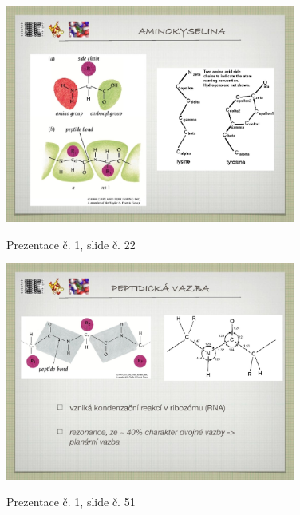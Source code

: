 \documentclass[DIV=8]{scrreprt}
\begin{document}
\begin{figure}
    \caption{Prezentace č. 1, slide č. 22}
    \includegraphics[width=0.85\textwidth]{slides-1/slide-22.jpg}
    \centering
    \label{slides-1-slide-22}
\end{figure}
\begin{figure}
    \caption{Prezentace č. 1, slide č. 51}
    \includegraphics[width=0.85\textwidth]{slides-1/slide-51.jpg}
    \centering
    \label{slides-1-slide-51}
\end{figure}
\end{document}
